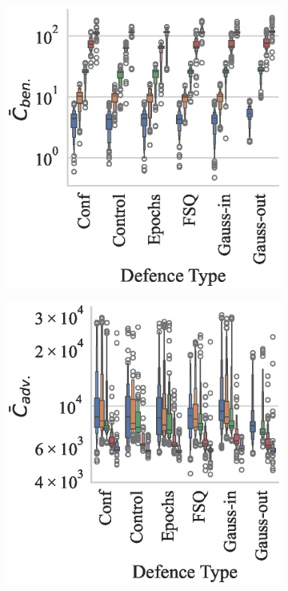 \begin{figure}
    \centering
    \begin{subfigure}{.28\textwidth}
        \centering
        \includegraphics[width=\textwidth]{cifar100/ben_failures_per_train_time_vs_defence_type.eps}
    \end{subfigure}
    \begin{subfigure}{0.28\textwidth}
        \includegraphics[width=\textwidth]{cifar100/adv_failures_per_train_time_vs_defence_type.eps}

\end{subfigure}
\end{figure}
